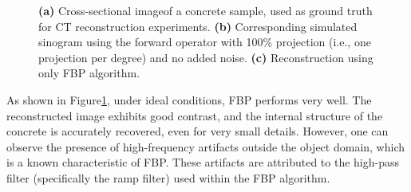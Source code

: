 \documentclass{article}
\begin{document}
\begin{figure}[H]%
    \centering
    \qquad
    \qquad
    \caption{ \textbf{(a)} Cross-sectional image\footnotemark of a concrete sample, used as ground truth for CT reconstruction experiments. \textbf{(b)} Corresponding simulated sinogram using the forward operator with 100\% projection (i.e., one projection per degree) and no added noise. \textbf{(c)} Reconstruction using only FBP algorithm. }
    \label{fig:concrete+sino}
\end{figure}

As shown in Figure\ref{fig:concrete+sino}, under ideal conditions, FBP performs very well. The reconstructed image exhibits good contrast, and the internal structure of the concrete is accurately recovered, even for very small details. However, one can observe the presence of high-frequency artifacts outside the object domain, which is a known characteristic of FBP. These artifacts are attributed to the high-pass filter (specifically the ramp filter) used within the FBP algorithm.
\medskip
\end{document}

